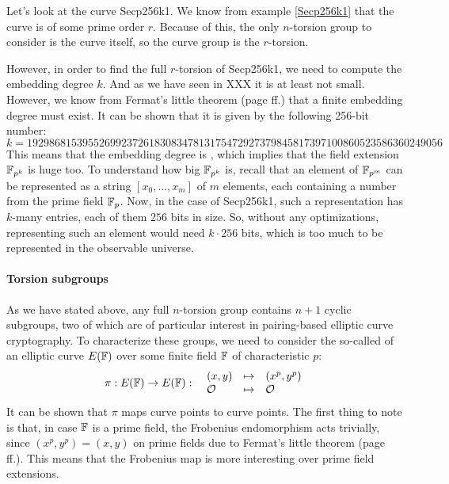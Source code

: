 \begin{example} 
Let's look at the curve Secp256k1. We know from example \ref{Secp256k1} that the curve is of some prime order $r$. Because of this, the only $n$-torsion group to consider is the curve itself, so the curve group is the $r$-torsion. 

However, in order to find the full $r$-torsion of Secp256k1, we need to compute the embedding degree $k$. And as we have seen in XXX it is at least not small. However, we know from Fermat's little theorem (page \pageref{fermats-little-theorem} ff.) that a finite embedding degree must exist. It can be shown that it is given by the following 256-bit number:
$$
k = \scriptstyle 192986815395526992372618308347813175472927379845817397100860523586360249056 
$$
 This means that the embedding degree is , which implies that the field extension $\mathbb{F}_{p^k}$ is huge too. To understand how big $\mathbb{F}_{p^k}$ is, recall that an element of $\mathbb{F}_{p^m}$ can be represented as a string $[x_0,\ldots,x_m]$ of $m$ elements, each containing a number from the prime field $\mathbb{F}_p$. Now, in the case of Secp256k1, such a representation has $k$-many entries, each of them $256$ bits in size. So, without any optimizations, representing such an element would need $k\cdot 256$ bits, which is too much to be represented in the observable universe.
\end{example}

\paragraph{Torsion subgroups}As we have stated above, any full $n$-torsion group contains $n+1$ cyclic subgroups, two of which are of particular interest in pairing-based elliptic curve cryptography. To characterize these groups, we need to consider the so-called  of an elliptic curve $E(\mathbb{F})$ over some finite field $\mathbb{F}$ of characteristic $p$:
\begin{equation}\label{eq:frobenius-enomorphism}
\pi : E(\mathbb{F}) \to E(\mathbb{F}): \;\; 
\begin{array}{lcl}
(x,y)       &\mapsto & (x^p,y^p)\\
\mathcal{O} &\mapsto & \mathcal{O}
\end{array} 
\end{equation}
It can be shown that $\pi$ maps curve points to curve points. The first thing to note is that, in case  $\mathbb{F}$ is a prime field, the Frobenius endomorphism acts trivially, since $(x^p,y^p) = (x,y)$ on prime fields due to Fermat's little theorem (page \pageref{fermats-little-theorem} ff.). This means that the Frobenius map is more interesting over prime field extensions.

